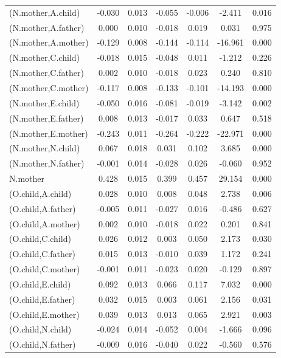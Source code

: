 \documentclass[11pt,a5paper,twoside]{book}
\begin{document}
{{\begin{center}
\begin{longtable}{@{\extracolsep{\fill}}lcccccc@{}}
   (N.mother,A.child)  & -0.030 & 0.013 & -0.055 & -0.006 & -2.411 & 0.016 \\ 
   (N.mother,A.father)  & 0.000 & 0.010 & -0.018 & 0.019 & 0.031 & 0.975 \\ 
   (N.mother,A.mother)  & -0.129 & 0.008 & -0.144 & -0.114 & -16.961 & 0.000 \\ 
   (N.mother,C.child)  & -0.018 & 0.015 & -0.048 & 0.011 & -1.212 & 0.226 \\ 
   (N.mother,C.father)  & 0.002 & 0.010 & -0.018 & 0.023 & 0.240 & 0.810 \\ 
  (N.mother,C.mother)  & -0.117 & 0.008 & -0.133 & -0.101 & -14.193 & 0.000 \\ 
   (N.mother,E.child)  & -0.050 & 0.016 & -0.081 & -0.019 & -3.142 & 0.002 \\ 
   (N.mother,E.father)  & 0.008 & 0.013 & -0.017 & 0.033 & 0.647 & 0.518 \\ 
   (N.mother,E.mother)  & -0.243 & 0.011 & -0.264 & -0.222 & -22.971 & 0.000 \\ 
   (N.mother,N.child)  & 0.067 & 0.018 & 0.031 & 0.102 & 3.685 & 0.000 \\ 
   (N.mother,N.father)  & -0.001 & 0.014 & -0.028 & 0.026 & -0.060 & 0.952 \\ 
   N.mother  & 0.428 & 0.015 & 0.399 & 0.457 & 29.154 & 0.000 \\ 
   (O.child,A.child)  & 0.028 & 0.010 & 0.008 & 0.048 & 2.738 & 0.006 \\ 
   (O.child,A.father)  & -0.005 & 0.011 & -0.027 & 0.016 & -0.486 & 0.627 \\ 
   (O.child,A.mother)  & 0.002 & 0.010 & -0.018 & 0.022 & 0.201 & 0.841 \\ 
   (O.child,C.child)  & 0.026 & 0.012 & 0.003 & 0.050 & 2.173 & 0.030 \\ 
   (O.child,C.father)  & 0.015 & 0.013 & -0.010 & 0.039 & 1.172 & 0.241 \\ 
   (O.child,C.mother)  & -0.001 & 0.011 & -0.023 & 0.020 & -0.129 & 0.897 \\ 
   (O.child,E.child)  & 0.092 & 0.013 & 0.066 & 0.117 & 7.032 & 0.000 \\ 
   (O.child,E.father)  & 0.032 & 0.015 & 0.003 & 0.061 & 2.156 & 0.031 \\ 
   (O.child,E.mother)  & 0.039 & 0.013 & 0.013 & 0.065 & 2.921 & 0.003 \\ 
   (O.child,N.child)  & -0.024 & 0.014 & -0.052 & 0.004 & -1.666 & 0.096 \\ 
   (O.child,N.father)  & -0.009 & 0.016 & -0.040 & 0.022 & -0.560 & 0.576 \\ 

\end{longtable}
\end{center}}}
\end{document}
